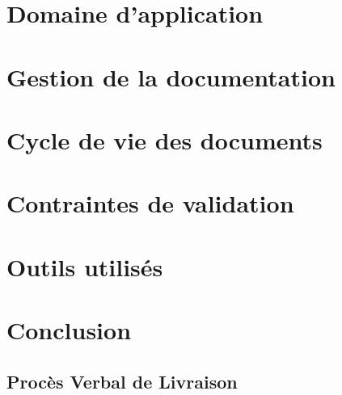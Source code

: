 \part{Domaine d’application}
\setcounter{section}{0}

\part{Gestion de la documentation}
\setcounter{section}{0}

\part{Cycle de vie des documents}
\setcounter{section}{0}

\part{Contraintes de validation }
\setcounter{section}{0}

\part{Outils utilisés}
\setcounter{section}{0}

\part{Conclusion}
\setcounter{section}{0}


\appendix
\chapter{Procès Verbal de Livraison}




